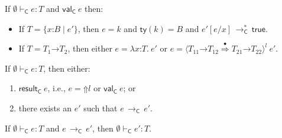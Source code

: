 \documentclass[9pt]{extarticle}
\newcommand{\ottnt}[1]{\mathit{#1}}
\newcommand{\ottsym}[1]{#1}
\begin{document}
{\ifpopl
\begin{lemma}
  If $ \emptyset   \vdash _{  \mathsf{C}  }  \ottnt{e}  :  \ottnt{T} $ and $ \mathsf{val} _{  \mathsf{C}  }~ \ottnt{e} $ then:
\begin{itemize}
  \item If $\ottnt{T}  \ottsym{=}   \{ \mathit{x} \mathord{:} \ottnt{B} \mathrel{\mid} \ottnt{e'} \} $, then $\ottnt{e}  \ottsym{=}  \ottnt{k}$ and $ \mathsf{ty} ( \ottnt{k} )   \ottsym{=}  \ottnt{B}$
    and $ \ottnt{e'}  [  \ottnt{e} / \mathit{x}  ]  \,  \longrightarrow ^{*}_{  \mathsf{C}  }  \,  \mathsf{true} $.
  \item If $\ottnt{T}  \ottsym{=}   \ottnt{T_{{\mathrm{1}}}} \mathord{ \rightarrow } \ottnt{T_{{\mathrm{2}}}} $, then either $\ottnt{e}  \ottsym{=}   \lambda \mathit{x} \mathord{:} \ottnt{T} .~  \ottnt{e'} $ or $\ottnt{e}  \ottsym{=}   \langle   \ottnt{T_{{\mathrm{11}}}} \mathord{ \rightarrow } \ottnt{T_{{\mathrm{12}}}}   \mathord{ \overset{\bullet}{\Rightarrow} }   \ottnt{T_{{\mathrm{21}}}} \mathord{ \rightarrow } \ottnt{T_{{\mathrm{22}}}}   \rangle^{ \ottnt{l} } ~  \ottnt{e'} $.
  \end{itemize}
\end{lemma}

\begin{lemma}
  If $ \emptyset   \vdash _{  \mathsf{C}  }  \ottnt{e}  :  \ottnt{T} $, then either:
  \begin{enumerate}
  \item $ \mathsf{result} _{  \mathsf{C}  }~ \ottnt{e} $, i.e., $\ottnt{e}  \ottsym{=}   \mathord{\Uparrow}  \ottnt{l} $ or $ \mathsf{val} _{  \mathsf{C}  }~ \ottnt{e} $; or
  \item there exists an $\ottnt{e'}$ such that $\ottnt{e} \,  \longrightarrow _{  \mathsf{C}  }  \, \ottnt{e'}$.
  \end{enumerate}
\end{lemma}

\begin{lemma}
  If $ \emptyset   \vdash _{  \mathsf{C}  }  \ottnt{e}  :  \ottnt{T} $ and $\ottnt{e} \,  \longrightarrow _{  \mathsf{C}  }  \, \ottnt{e'}$, then $ \emptyset   \vdash _{  \mathsf{C}  }  \ottnt{e'}  :  \ottnt{T} $.
\end{lemma}
\fi}
\end{document}
